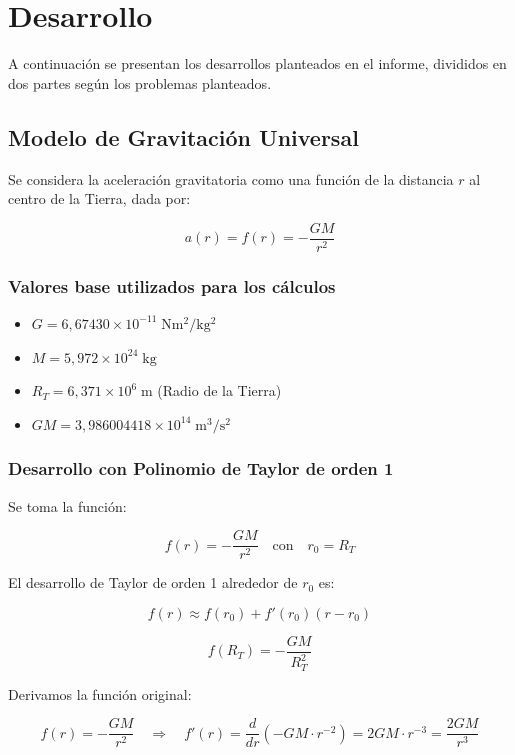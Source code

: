 \documentclass{article}
\begin{document}
\section{Desarrollo}\label{sec:desarrollo}
A continuación se presentan los desarrollos planteados en el informe, divididos en dos partes según los problemas planteados.

\subsection{Modelo de Gravitación Universal}

Se considera la aceleración gravitatoria como una función de la distancia $r$ al centro de la Tierra, dada por:

\[
a(r) = f(r) = -\frac{GM}{r^2}
\]

\subsubsection*{Valores base utilizados para los cálculos}

\begin{itemize}
    \item $G = 6{,}67430 \times 10^{-11} \; \mathrm{Nm^2/kg^2}$
    \item $M = 5{,}972 \times 10^{24} \; \mathrm{kg}$
    \item $R_T = 6{,}371 \times 10^{6} \; \mathrm{m}$ \hfill (Radio de la Tierra)
    \item $GM = 3{,}986004418 \times 10^{14} \; \mathrm{m^3/s^2}$
\end{itemize}

\subsubsection{Desarrollo con Polinomio de Taylor de orden 1}

Se toma la función:

\[
f(r) = -\frac{GM}{r^2}
\quad \text{con} \quad r_0 = R_T
\]

El desarrollo de Taylor de orden 1 alrededor de $r_0$ es:

\[
f(r) \approx f(r_0) + f'(r_0)(r - r_0)
\]

\[
f(R_T) = -\frac{GM}{R_T^2}
\]

Derivamos la función original:

\[
f(r) = -\frac{GM}{r^2}
\quad \Rightarrow \quad
f'(r) = \frac{d}{dr} \left( -GM \cdot r^{-2} \right) = 2GM \cdot r^{-3} = \frac{2GM}{r^3}
\]
\end{document}
